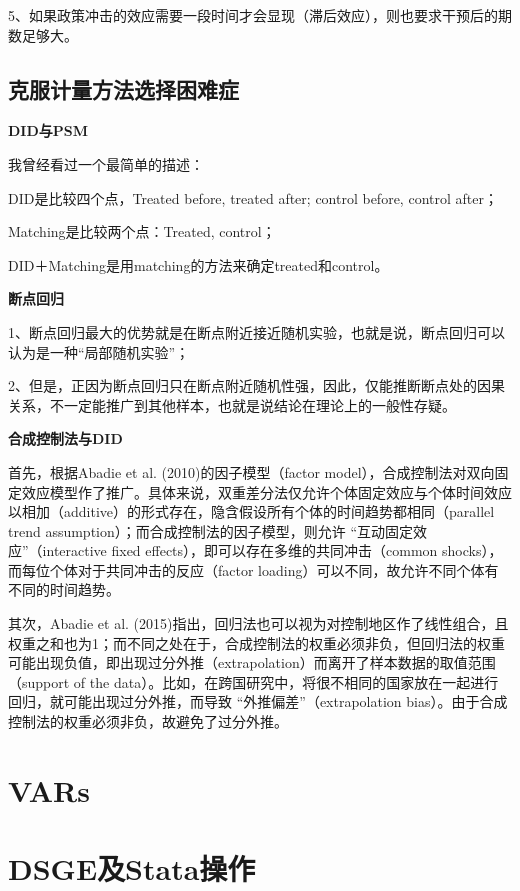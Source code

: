 \documentclass[cn,10pt,math=newtx,citestyle=gb7714-2015,bibstyle=gb7714-2015]{elegantbook}
\begin{document}
	5、如果政策冲击的效应需要一段时间才会显现（滞后效应），则也要求干预后的期数足够大。
	
	\section{克服计量方法选择困难症}
	\textbf{DID与PSM}
	
	我曾经看过一个最简单的描述：
	
	DID是比较四个点，Treated before, treated after; control before, control after；
	
	Matching是比较两个点：Treated, control；
	
	DID＋Matching是用matching的方法来确定treated和control。
	
	
	\textbf{断点回归}
	
	1、断点回归最大的优势就是在断点附近接近随机实验，也就是说，断点回归可以认为是一种“局部随机实验”；
	
	2、但是，正因为断点回归只在断点附近随机性强，因此，仅能推断断点处的因果关系，不一定能推广到其他样本，也就是说结论在理论上的一般性存疑。
	
	
	\textbf{合成控制法与DID}
	
	首先，根据Abadie et al. (2010)的因子模型（factor model），合成控制法对双向固定效应模型作了推广。具体来说，双重差分法仅允许个体固定效应与个体时间效应以相加（additive）的形式存在，隐含假设所有个体的时间趋势都相同（parallel trend assumption）；而合成控制法的因子模型，则允许 “互动固定效应”（interactive fixed effects），即可以存在多维的共同冲击（common shocks），而每位个体对于共同冲击的反应（factor loading）可以不同，故允许不同个体有不同的时间趋势。
	
	其次，Abadie et al. (2015)指出，回归法也可以视为对控制地区作了线性组合，且权重之和也为1；而不同之处在于，合成控制法的权重必须非负，但回归法的权重可能出现负值，即出现过分外推（extrapolation）而离开了样本数据的取值范围（support of the data）。比如，在跨国研究中，将很不相同的国家放在一起进行回归，就可能出现过分外推，而导致 “外推偏差”（extrapolation bias）。由于合成控制法的权重必须非负，故避免了过分外推。
	
	\chapter{VARs}
	
	
	\chapter{DSGE及Stata操作}
	
\end{document}
